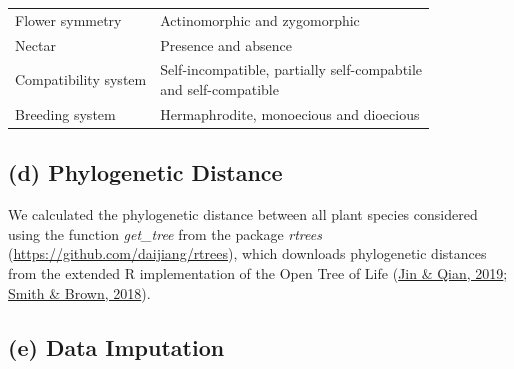 \documentclass[
  12pt,
  a4paper,
]{article}
\begin{document}
\begin{table}
\begin{tabular}[t]{ll}
\hspace{1em}Flower symmetry & Actinomorphic and zygomorphic\\
\hspace{1em}Nectar & Presence and absence\\
\hspace{1em}Compatibility system & \makecell[l]{Self-incompatible, partially self-compabtile \\ and self-compatible}\\
\hspace{1em}Breeding system & Hermaphrodite, monoecious and dioecious\\
\bottomrule
\end{tabular}
\end{table}

\doublespacing

\hypertarget{d-phylogenetic-distance}{%
\subsection{(d) Phylogenetic Distance}\label{d-phylogenetic-distance}}

We calculated the phylogenetic distance between all plant species considered using the function \emph{get\_tree} from the package \emph{rtrees} (\url{https://github.com/daijiang/rtrees}), which downloads phylogenetic distances from the extended R implementation of the Open Tree of Life (\protect\hyperlink{ref-jin2019}{Jin \& Qian, 2019}; \protect\hyperlink{ref-smith2018}{Smith \& Brown, 2018}).

\hypertarget{e-data-imputation}{%
\subsection{(e) Data Imputation}\label{e-data-imputation}}
\end{document}
